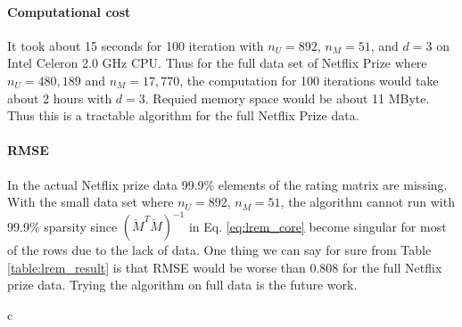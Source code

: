 \documentclass{article}
\begin{document}
\paragraph{Computational cost}
It took about 15 seconds for 100 iteration with $n_U=892$, $n_M=51$, and $d=3$ on Intel Celeron 2.0 GHz CPU. Thus for the full data set of Netflix Prize where $n_U=480,189$ and $n_M=17,770$, the computation for 100 iterations would take about 2 hours with $d=3$. Requied memory space would be about 11 MByte. Thus this is a tractable algorithm for the full Netflix Prize data.

\paragraph{RMSE}
In the actual Netflix prize data 99.9\% elements of the rating matrix are missing. With the small data set where $n_U=892$, $n_M=51$, the algorithm cannot run with 99.9\% sparsity since $(\check{M}^T\check{M})^{-1}$ in Eq. \ref{eq:lrem_core} become singular for most of the rows due to the lack of data. One thing we can say for sure from Table \ref{table:lrem_result} is that RMSE would be worse than 0.808 for the full Netflix prize data. Trying the algorithm on full data is the future work.



\if c\LaTeXe
\quad
\else
\end{document}
